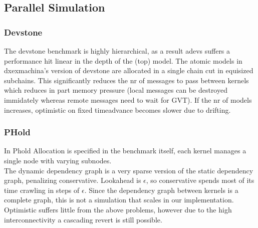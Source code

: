 \subsection{Parallel Simulation}
\subsubsection{Devstone}
The devstone \cite{DEVStone} benchmark is highly hierarchical, as a result adevs suffers a performance hit linear in the depth of the (top) model. The atomic models in dxexmachina's version of devstone are allocated in a single chain cut in equisized subchains. This significantly reduces the nr of messages to pass between kernels which reduces in part memory pressure (local messages can be destroyed immidately whereas remote messages need to wait for GVT). If the nr of models increases, optimistic on fixed timeadvance becomes slower due to drifting.
\subsubsection{PHold}
In Phold \cite{PHOLD} Allocation is specified in the benchmark itself, each kernel manages a single node with varying subnodes.\\
The dynamic dependency graph is a very sparse version of the static dependency graph, penalizing conservative. Lookahead is $\epsilon$, so conservative spends most of its time crawling in steps of $\epsilon$. Since the dependency graph between kernels is a complete graph, this is not a simulation that scales in our implementation.\\
Optimistic suffers little from the above problems, however due to the high interconnectivity a cascading revert is still possible.

